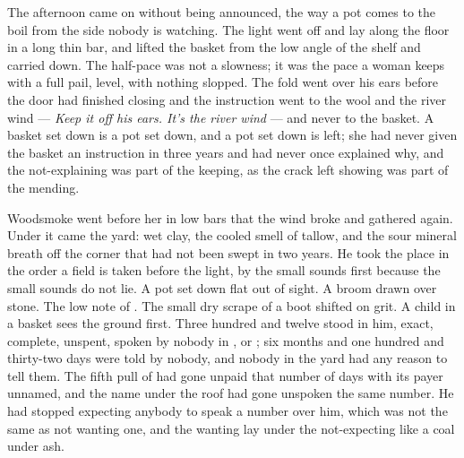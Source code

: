 The afternoon came on without being announced, the way a pot comes to the boil from the side nobody is watching. The light went off  and lay along the floor in a long thin bar, and  lifted the basket from the low angle of the shelf and carried  down. The half-pace was not a slowness; it was the pace a woman keeps with a full pail, level, with nothing slopped. The fold went over his ears before the door had finished closing and the instruction went to the wool and the river wind --- \emph{Keep it off his ears. It's the river wind} --- and never to the basket. A basket set down is a pot set down, and a pot set down is left; she had never given the basket an instruction in three years and had never once explained why, and the not-explaining was part of the keeping, as the crack left showing was part of the mending.

Woodsmoke went before her in low bars that the wind broke and gathered again. Under it came the yard: wet clay, the cooled smell of tallow, and the sour mineral breath off the corner that had not been swept in two years. He took the place in the order a field is taken before the light, by the small sounds first because the small sounds do not lie. A pot set down flat out of sight. A broom drawn over stone. The low note of . The small dry scrape of a boot shifted on grit. A child in a basket sees the ground first. Three hundred and twelve stood in him, exact, complete, unspent, spoken by nobody in ,  or ; six months and one hundred and thirty-two days were told by nobody, and nobody in the yard had any reason to tell them. The fifth pull of  had gone unpaid that number of days with its payer unnamed, and the name under the roof had gone unspoken the same number. He had stopped expecting anybody to speak a number over him, which was not the same as not wanting one, and the wanting lay under the not-expecting like a coal under ash.

